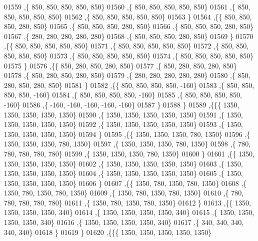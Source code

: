 \begin{DoxyCode}
01559    ,\{   850,   850,   850,   850,   850\}
01560    ,\{   850,   850,   850,   850,   850\}
01561    ,\{   850,   850,   850,   850,   850\}
01562    ,\{   850,   850,   850,   850,   850\}
01563    \}
01564   ,\{\{   850,   850,   850,   280,   850\}
01565    ,\{   850,   850,   850,   280,   850\}
01566    ,\{   850,   850,   850,   280,   850\}
01567    ,\{   280,   280,   280,   280,   280\}
01568    ,\{   850,   850,   850,   280,   850\}
01569    \}
01570   ,\{\{   850,   850,   850,   850,   850\}
01571    ,\{   850,   850,   850,   850,   850\}
01572    ,\{   850,   850,   850,   850,   850\}
01573    ,\{   850,   850,   850,   850,   850\}
01574    ,\{   850,   850,   850,   850,   850\}
01575    \}
01576   ,\{\{   850,   280,   850,   280,   850\}
01577    ,\{   850,   280,   850,   280,   850\}
01578    ,\{   850,   280,   850,   280,   850\}
01579    ,\{   280,   280,   280,   280,   280\}
01580    ,\{   850,   280,   850,   280,   850\}
01581    \}
01582   ,\{\{   850,   850,   850,   850,  -160\}
01583    ,\{   850,   850,   850,   850,  -160\}
01584    ,\{   850,   850,   850,   850,  -160\}
01585    ,\{   850,   850,   850,   850,  -160\}
01586    ,\{  -160,  -160,  -160,  -160,  -160\}
01587    \}
01588   \}
01589  ,\{\{\{  1350,  1350,  1350,  1350,  1350\}
01590    ,\{  1350,  1350,  1350,  1350,  1350\}
01591    ,\{  1350,  1350,  1350,  1350,  1350\}
01592    ,\{  1350,  1350,  1350,  1350,  1350\}
01593    ,\{  1350,  1350,  1350,  1350,  1350\}
01594    \}
01595   ,\{\{  1350,  1350,  1350,   780,  1350\}
01596    ,\{  1350,  1350,  1350,   780,  1350\}
01597    ,\{  1350,  1350,  1350,   780,  1350\}
01598    ,\{   780,   780,   780,   780,   780\}
01599    ,\{  1350,  1350,  1350,   780,  1350\}
01600    \}
01601   ,\{\{  1350,  1350,  1350,  1350,  1350\}
01602    ,\{  1350,  1350,  1350,  1350,  1350\}
01603    ,\{  1350,  1350,  1350,  1350,  1350\}
01604    ,\{  1350,  1350,  1350,  1350,  1350\}
01605    ,\{  1350,  1350,  1350,  1350,  1350\}
01606    \}
01607   ,\{\{  1350,   780,  1350,   780,  1350\}
01608    ,\{  1350,   780,  1350,   780,  1350\}
01609    ,\{  1350,   780,  1350,   780,  1350\}
01610    ,\{   780,   780,   780,   780,   780\}
01611    ,\{  1350,   780,  1350,   780,  1350\}
01612    \}
01613   ,\{\{  1350,  1350,  1350,  1350,   340\}
01614    ,\{  1350,  1350,  1350,  1350,   340\}
01615    ,\{  1350,  1350,  1350,  1350,   340\}
01616    ,\{  1350,  1350,  1350,  1350,   340\}
01617    ,\{   340,   340,   340,   340,   340\}
01618    \}
01619   \}
01620  ,\{\{\{  1350,  1350,  1350,  1350,  1350\}

\end{DoxyCode}
